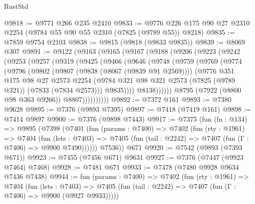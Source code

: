 \begin{lexlean}{RustStd}
\begin{coremodule}
@9818 := @9771 @266 @235 @2410
@9833 := @9776 @226 @175 @90 @27 @2310 @2254 (@9784 @55 @90 @55 @2310 (@7825 (@9789 @55)) @8218)
@9835 := @7859 @9754 @2103
@9838 := @9815 (@9818 (@9833 @9835))
@9839 := @8069 @307
@9891 := @9122
    (@9163
      (@9165
        (@9167
          (@9188
            (@9206
              (@9223
                (@9242
                  (@9253
                    (@9257
                      (@9319
                        (@9425
                          (@9466
                            (@9646
                              (@9748
                                (@9759
                                  (@9769
                                    (@9774
                                      (@9796
                                        (@9802
                                          (@9807 (@9838 (@8067 (@9839 @91 @2569))))
                                          (@9776
                                            @351
                                            @175
                                            @98
                                            @27
                                            @2573
                                            @2254
                                            (@9784
                                              @321
                                              @98
                                              @321
                                              @2573
                                              (@7825 (@9789 @321))
                                              (@7833 (@7834 @2573)))
                                            @9835))))
                                    @8138))))))
                        @8795
                        (@7922 (@8800 @98 @363 @9266))
                        @8807))))))))))
@9892 := @7372 @161
@9893 := @7380 @9628
@9895 := @7376 (@9893 @7395)
@9897 := @7418 (@7419 @161)
@9898 := @7414 @9897
@9900 := @7376 (@9898 @7443)
@9917 := @7375
    (fun (fn : @134) =>
    @9895
      (@7398
        (@7401
          (fun (params : @7400) =>
          @7402
            (fun (rty : @1961) =>
            @7404
              (fun (lets : @7403) =>
              @7405 (fun (tail : @2242) => @7407 (fun (Γ : @7406) => @9900 @7490))))))
        @7536))
    @671
@9920 := @7542 (@9893 (@7393 @671))
@9923 := @7455 (@7456 @671) @9631
@9927 := @7376 (@7447 (@9923 @7464) @7468)
@9928 := @7481 @671
@9933 := @7478 (@7480 @9928 @9634 @7436 @7438)
@9944 := fun (params : @7400) =>
  @7402
    (fun (rty : @1961) =>
    @7404
      (fun (lets : @7403) =>
      @7405 (fun (tail : @2242) => @7407 (fun (Γ : @7406) => @9900 (@9927 @9933)))))

\end{coremodule}
\end{lexlean}
